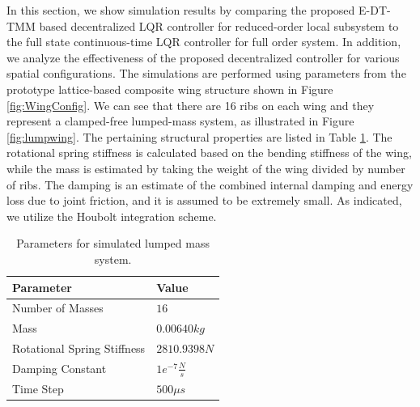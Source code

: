 \documentclass[11pt]{ucthesis}
\begin{document}
In this section, we show simulation results by comparing the proposed E-DT-TMM based decentralized LQR controller for reduced-order local subsystem to the full state continuous-time LQR controller for full order system. In addition, we analyze the effectiveness of the proposed decentralized controller for various spatial configurations. The simulations are performed using parameters from the prototype lattice-based composite wing structure shown in Figure \ref{fig:WingConfig}. We can see that there are 16 ribs on each wing and they represent a clamped-free lumped-mass system, as illustrated in Figure \ref{fig:lumpwing}. The pertaining structural properties are listed in Table \ref{t:beam}. The rotational spring stiffness is calculated based on the bending stiffness of the wing, while the mass is estimated by taking the weight of the wing divided by number of ribs. The damping is an estimate of the combined internal damping and energy loss due to joint friction, and it is assumed to be extremely small. As indicated, we utilize the Houbolt integration scheme. 

\begin{table}
\begin{center}
\caption{Parameters for simulated lumped mass system.}
\label{t:beam}
\begin{tabular}{  p{5cm} p{1.9cm}}
Parameter&Value\\\hline
Number of Masses&$16$\\
Mass&$0.00640 kg$\\
Rotational Spring Stiffness&$2810.9398 N$\\
Damping Constant&$1e^{-7}\frac{N}{s}$\\
Time Step&$500 \mu s$\\
\end{tabular}
\end{center}
\end{table}
\end{document}
